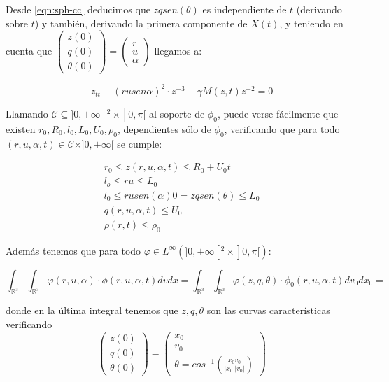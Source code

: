 \documentclass[a4paper,10pt]{scrartcl}
\theoremstyle{definition}
\numberwithin{equation}{section}
\begin{document}
Desde \eqref{eqn:sph-cc} deducimos que $zqsen(\theta)$ es independiente de $t$ (derivando sobre $t$) y también, derivando la primera componente de $X(t)$, y teniendo en cuenta que $\left(\begin{array}{c} z(0)\\ q(0)\\ \theta(0) \end{array}\right) = 
\left(\begin{array}{c} r\\ u\\ \alpha\end{array}\right)$ llegamos a:

\begin{equation}
\label{eqn:curves}
 z_{tt} - (ru sen\alpha)^2 \cdot z^{-3} - \gamma M(z,t) z^{-2} = 0
\end{equation}

Llamando $\mathcal{C} \subseteq ]0, +\infty[^2 \times ]0, \pi[$ al soporte de $\phi_0$, puede verse fácilmente que existen $r_0, R_0, l_0, L_0, U_0, \rho_0$, dependientes sólo de $\phi_0$, verificando que para todo $(r,u,\alpha,t) \in \mathcal{C} \times ]0, +\infty[$ se cumple:

\begin{align}
 r_0 \le z(r,u,\alpha,t) \le R_0 + U_0 t \nonumber\\
 l_o \le ru \le L_0 \nonumber\\
 l_0 \le ru sen(\alpha) 0 = zq sen(\theta) \le L_0 \nonumber\\
 q(r,u,\alpha, t) \le U_0 \nonumber \\
 \rho(r,t) \le \rho_0 \label{eqn:zbounds}
\end{align}

Además tenemos que para todo $\varphi \in L^{\infty}(]0,+\infty[^2 \times ]0,\pi[)$:

\[
    \int_{\mathbb{R}^3}\int_{\mathbb{R}^3} \varphi(r,u,\alpha) \cdot \phi(r,u,\alpha,t) dv dx = 
    \int_{\mathbb{R}^3}\int_{\mathbb{R}^3} \varphi(z,q,\theta) \cdot \phi_0(r,u,\alpha,t) dv_0 dx_0 = 
\]

donde en la última integral tenemos que $z,q,\theta$ son las curvas características verificando 
\[
    \left(\begin{array}{c} z(0)\\ q(0)\\ \theta(0) \end{array}\right) = 
    \left(\begin{array}{c} x_0\\ v_0\\ \theta=cos^{-1}\left(\frac{x_0 v_0}{|x_0||v_0|}\right) \end{array}\right)
\]
\end{document}
